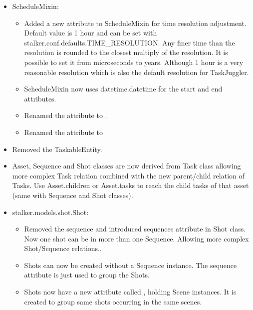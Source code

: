 \documentclass[a4paper,10pt,english]{sphinxmanual}
\begin{document}
\begin{itemize}
\begin{itemize}
\end{itemize}

\item {} 
ScheduleMixin:
\begin{itemize}
\item {} 
Added a new attribute to ScheduleMixin for time resolution adjustment.
Default value is 1 hour and can be set with
stalker.conf.defaults.TIME\_RESOLUTION. Any finer time than the resolution
is rounded to the closest multiply of the resolution. It is possible to set
it from microseconds to years. Although 1 hour is a very reasonable
resolution which is also the default resolution for TaskJuggler.

\item {} 
ScheduleMixin now uses datetime.datetime for the start and end attributes.

\item {} 
Renamed the  attribute to .

\item {} 
Renamed the  attribute to 

\end{itemize}

\item {} 
Removed the TaskableEntity.

\item {} 
Asset, Sequence and Shot classes are now derived from Task class allowing
more complex Task relation combined with the new parent/child relation of
Tasks. Use Asset.children or Asset.tasks to reach the child tasks of that
asset (same with Sequence and Shot classes).

\item {} 
stalker.models.shot.Shot:
\begin{itemize}
\item {} 
Removed the sequence and introduced sequences attribute in Shot class. Now
one shot can be in more than one Sequence. Allowing more complex
Shot/Sequence relations..

\item {} 
Shots can now be created without a Sequence instance. The sequence
attribute is just used to group the Shots.

\item {} 
Shots now have a new attribute called , holding Scene instances.
It is created to group same shots occurring in the same scenes.

\end{itemize}


\end{itemize}
\end{document}
